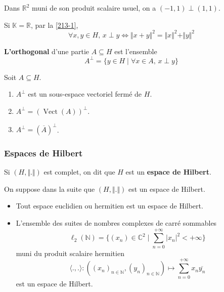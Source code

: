   \begin{example}
    Dans $\mathbb{R}^2$ muni de son produit scalaire usuel, on a $(-1,1) \perp (1,1)$.
  \end{example}

  \begin{remark}
    Si $\mathbb{K} = \mathbb{R}$, par la \cref{213-1},
    \[ \forall x, y \in H, \, x \perp y \iff \Vert x + y \Vert^2 = \Vert x \Vert^2 + \Vert y \Vert^2 \]
  \end{remark}

  \begin{definition}
    \textbf{L'orthogonal} d'une partie $A \subseteq H$ est l'ensemble
    \[ A^\perp = \{ y \in H \mid \forall x \in A, \, x \perp y \} \]
  \end{definition}


  \begin{proposition}
    Soit $A \subseteq H$.
    \begin{enumerate}[label=(\roman*)]
      \item $A^\perp$ est un sous-espace vectoriel fermé de $H$.
      \item $A^\perp = (\operatorname{Vect}(A))^\perp$.
      \item $A^\perp = (\overline{A})^\perp$.
    \end{enumerate}
  \end{proposition}

  \subsubsection{Espaces de Hilbert}


  \begin{definition}
    Si $(H, \Vert . \Vert)$ est complet, on dit que $H$ est un \textbf{espace de Hilbert}.
  \end{definition}

  On suppose dans la suite que $(H, \Vert . \Vert)$ est un espace de Hilbert.

  \begin{example}
    \begin{itemize}
      \item Tout espace euclidien ou hermitien est un espace de Hilbert.
      \item L'ensemble des suites de nombres complexes de carré sommables
      \[ \ell_2(\mathbb{N}) = \{ (x_n) \in \mathbb{C}^2 \mid \sum_{n=0}^{+\infty} \vert x_n \vert^2 < +\infty \} \]
      muni du produit scalaire hermitien
      \[ \langle ., . \rangle : ((x_n)_{n \in \mathbb{N}},(y_n)_{n \in \mathbb{N}}) \mapsto \sum_{n=0}^{+\infty} x_n \overline{y_n} \]
      est un espace de Hilbert.
    \end{itemize}
  \end{example}

